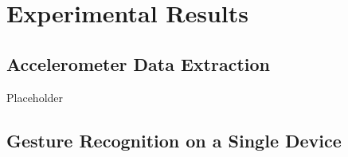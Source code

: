 
\section{Experimental Results}
\label{sec:Results}

\subsection{Accelerometer Data Extraction}

Placeholder

\subsection{Gesture Recognition on a Single Device}